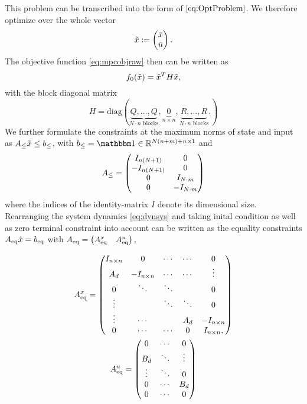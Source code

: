 This problem can be transcribed into the form of $ \eqref{eq:OptProblem} $. We therefore optimize over the whole vector \[ \tilde{x} := \begin{pmatrix} {\bar{x}} \\ {\bar{u}} \end{pmatrix}. \] The objective function \eqref{eq:mpcobjraw} then can  be written as
\[ f_0(\tilde{x}) = \tilde{x} ^T  H \tilde{x}, \] with  the block diagonal matrix \[ H = \mathrm{diag}(\underbrace{Q,\dots,Q}_{N\cdot n \text{ blocks}},\underbrace{0}_{n \times n},\underbrace{R,\dots,R}_{N \cdot n \text{ blocks}}.) \]
We further formulate the constraints at the maximum norms of state and input as $ {A}_{\mathrm{\leq}} \tilde{x} \leq {b}_{\mathrm{\leq}} $, with $ \bineq = \ones \in \R^{N(n+m)+n \times 1} $ and
\[ {A}_{\mathrm{\leq}} = \begin{pmatrix}
I_{n(N+1)} & 0\\
-I_{n(N+1)} & 0\\
0 & I_{N\cdot m}\\
0 & -I_{N\cdot m}
\end{pmatrix}\]
where the indices of the identity-matrix $ I $ denote its dimensional size.
Rearranging the system dynamics \eqref{eq:dynsys} and taking inital condition as well as zero terminal constraint into account can be written as the equality constraints $ {A}_{\mathrm{eq}} \tilde{x} = {b}_{\mathrm{eq}} $ with
$ {A}_{\mathrm{eq}} =   \left( {A}_{\mathrm{eq}}^x \quad {A}_{\mathrm{eq}}^u \right), $

\begin{gather*}
	{A}_{\mathrm{eq}}^x =  \begin{pmatrix}
	I_{n\times n} & 0 & \cdots & \cdots & 0\\
	A_d & -I_{n\times n} & \cdots & \cdots & \vdots\\
	0 & \ddots & \ddots &  &  0\\
	\vdots & & \ddots  & \ddots & 0\\
	\vdots & \cdots & & A_d & -I_{n\times n}\\
	0 &\cdots& \cdots & 0& I_{n\times n},
	\end{pmatrix}\\
	{A}_{\mathrm{eq}}^u = \begin{pmatrix}
	0 & \cdots & 0\\
	B_d &\ddots &\vdots\\
	\vdots &\ddots & 0\\
	0 & \cdots & B_d\\
	0 & \cdots & 0
	\end{pmatrix} 
\end{gather*}
